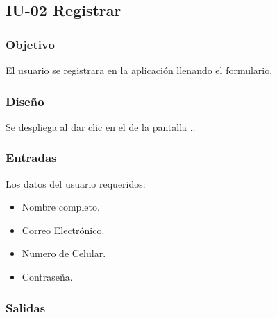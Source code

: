 \newpage
\subsection{IU-02 Registrar}

\subsubsection{Objetivo}
	El usuario se  registrara en la aplicación llenando el formulario.

\subsubsection{Diseño}
	Se despliega al dar clic en el  de la pantalla ..


\subsubsection{Entradas}
Los datos del usuario requeridos:
\begin{itemize}
	\item Nombre completo.
	\item Correo Electrónico.
	\item Numero de Celular.
	\item Contraseña.
\end{itemize}

\subsubsection{Salidas}
\begin{Citemize}
	\item {}
	\item {}
	\item {}
	\item {}
	\item {}
	\item {}
	\item {}
	\item {}
\end{Citemize}